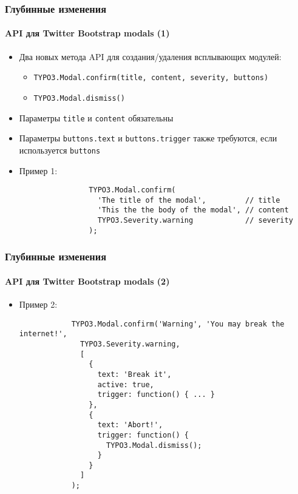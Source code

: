 \begin{frame}[fragile]
	\frametitle{Глубинные изменения}
	\framesubtitle{API для Twitter Bootstrap modals (1)}

	\lstset{basicstyle=\smaller\ttfamily}

	\begin{itemize}

		\item Два новых метода API для создания/удаления всплывающих модулей:
			\begin{itemize}
				\item \texttt{TYPO3.Modal.confirm(title, content, severity, buttons)}
				\item \texttt{TYPO3.Modal.dismiss()}
			\end{itemize}

		\item Параметры \texttt{title} и \texttt{content} обязательны
		\item Параметры \texttt{buttons.text} и \texttt{buttons.trigger} также требуются, если используется \texttt{buttons}

		\item Пример 1:

			\begin{lstlisting}
				TYPO3.Modal.confirm(
				  'The title of the modal',         // title
				  'This the the body of the modal', // content
				  TYPO3.Severity.warning            // severity
				);
			\end{lstlisting}

	\end{itemize}

\end{frame}


\begin{frame}[fragile]
	\frametitle{Глубинные изменения}
	\framesubtitle{API для Twitter Bootstrap modals (2)}

	\begin{itemize}

		\item Пример 2:

		\begin{lstlisting}
			TYPO3.Modal.confirm('Warning', 'You may break the internet!',
			  TYPO3.Severity.warning,
			  [
			    {
			      text: 'Break it',
			      active: true,
			      trigger: function() { ... }
			    },
			    {
			      text: 'Abort!',
			      trigger: function() {
			        TYPO3.Modal.dismiss();
			      }
			    }
			  ]
			);
		\end{lstlisting}

	\end{itemize}

\end{frame}

